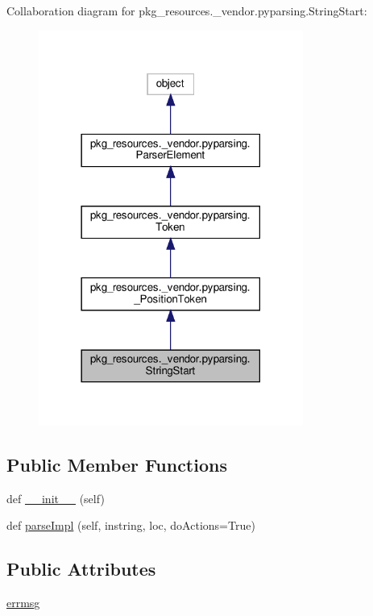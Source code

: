 Collaboration diagram for pkg\+\_\+resources.\+\_\+vendor.\+pyparsing.\+String\+Start\+:
\nopagebreak
\begin{figure}[H]
\begin{center}
\leavevmode
\includegraphics[width=246pt]{classpkg__resources_1_1__vendor_1_1pyparsing_1_1StringStart__coll__graph}
\end{center}
\end{figure}
\subsection*{Public Member Functions}
\begin{DoxyCompactItemize}
\item 
def \hyperlink{classpkg__resources_1_1__vendor_1_1pyparsing_1_1StringStart_a6f69bb4095ac5353e95703c37031f800}{\+\_\+\+\_\+init\+\_\+\+\_\+} (self)
\item 
def \hyperlink{classpkg__resources_1_1__vendor_1_1pyparsing_1_1StringStart_ae628fd3323c7c51d5ebba967bb717c84}{parse\+Impl} (self, instring, loc, do\+Actions=True)
\end{DoxyCompactItemize}
\subsection*{Public Attributes}
\begin{DoxyCompactItemize}
\item 
\hyperlink{classpkg__resources_1_1__vendor_1_1pyparsing_1_1StringStart_af0230225970611c98a0d6c8dd177bdde}{errmsg}
\end{DoxyCompactItemize}
